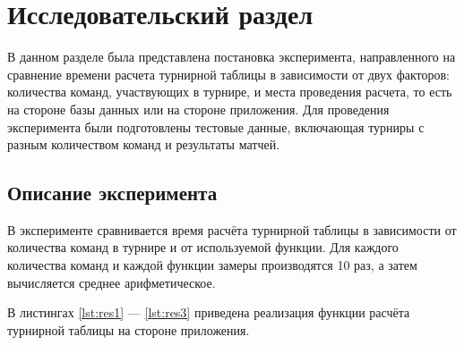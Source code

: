\section{Исследовательский раздел}
В данном разделе была представлена постановка эксперимента, направленного на сравнение времени расчета турнирной таблицы в зависимости от двух факторов: количества команд, участвующих в турнире, и места проведения расчета, то есть на стороне базы данных или на стороне приложения. Для проведения эксперимента были подготовлены тестовые данные, включающая турниры с разным количеством команд и результаты матчей.

\subsection{Описание эксперимента}
В эксперименте сравнивается время расчёта турнирной таблицы в зависимости от количества команд в турнире и от используемой функции. Для каждого количества команд и каждой функции замеры производятся 10 раз, а затем вычисляется среднее арифметическое.

В листингах \ref{lst:res1} --- \ref{lst:res3} приведена реализация функции расчёта турнирной таблицы на стороне приложения.

